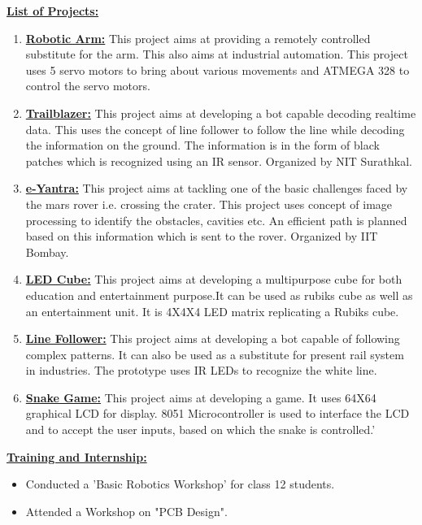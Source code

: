 \documentclass[10pt]{article}
\begin{document}
	\vspace{0.5cm}	
	\underline{\textbf{\Large{List of Projects:}}}
	\begin{enumerate}
		\item{\underline{\textbf{\large{Robotic Arm:}}} This project aims at providing a remotely controlled substitute for the arm. This   also aims at industrial automation. This   project uses 5 servo motors to bring about various movements and ATMEGA 328 to control the servo motors.}
		\item{\underline{\textbf{\large{Trailblazer:}}} This project aims at developing a bot capable decoding realtime data. This uses the concept of line follower to follow the line while decoding the information on the ground. The information is in the form of black patches which is recognized using an IR sensor. Organized by NIT Surathkal.}
		\item{\underline{\textbf{\large{e-Yantra:}}} This project aims at tackling one of the basic challenges faced by the mars rover i.e. crossing the crater. This project uses concept of image processing to identify the obstacles, cavities etc. An efficient path is planned based on this information which is sent to the rover. Organized by IIT Bombay.}
		\item{\underline{\textbf{\large{LED Cube:}}} This project aims at developing a multipurpose cube for both education and entertainment purpose.It can be used as rubiks cube as well as an entertainment unit. It is 4X4X4 LED matrix replicating a Rubiks cube.}
		\item{\underline{\textbf{\large{Line Follower:}}} This project aims at developing a bot capable of following complex patterns. It can also be used  as a substitute for present rail system in industries. The prototype uses IR LEDs to recognize the white line.}
		\item{\underline{\textbf{\large{Snake Game:}}} This project aims at developing a game. It uses 64X64 graphical LCD for display. 8051 Microcontroller is used to interface the LCD and to accept the user inputs, based on which the snake is controlled.'}
	\end{enumerate}

	\hfill
	
	\underline{\textbf{\Large{Training and Internship:}}}
	\begin{itemize}
		\item{Conducted a 'Basic Robotics Workshop' for class 12 students.}
		\item{Attended a Workshop on "PCB Design".}
	\end{itemize}
	
\end{document}
